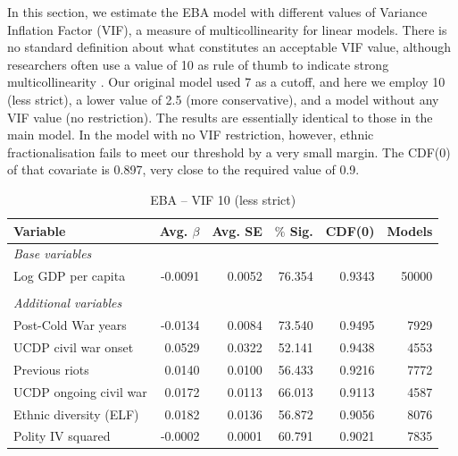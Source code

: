 In this section, we estimate the EBA model with different values of Variance Inflation Factor (VIF), a measure of multicollinearity for linear models. There is no standard definition about what constitutes an acceptable VIF value, although researchers often use a value of 10 as rule of thumb to indicate strong multicollinearity \citep[674]{o2007caution}. Our original model used 7 as a cutoff, and here we employ 10 (less strict), a lower value of 2.5 (more conservative), and a model without any VIF value (no restriction). The results are essentially identical to those in the main model. In the model with no VIF restriction, however, ethnic fractionalisation fails to meet our threshold by a very small margin. The CDF(0) of that covariate is 0.897, very close to the required value of 0.9. 

\vspace{1cm}

\begin{table}[H]
\centering
\begin{tabular}{lrrrrr}
\hline
\textbf{Variable} & \textbf{Avg. $\beta$} & \textbf{Avg. SE} & \textbf{$\%$ Sig.} & \textbf{CDF(0)} & \textbf{Models} \\ \hline
\textit{Base variables} &  &  &  &  &  \\
Log GDP per capita & -0.0091 & 0.0052 & 76.354 & 0.9343 & 50000 \\
 &  &  &  &  &  \\
\textit{Additional variables} &  &  &  &  &  \\
Post-Cold War years & -0.0134 & 0.0084 & 73.540 & 0.9495 & 7929 \\
UCDP civil war onset & 0.0529 & 0.0322 & 52.141 & 0.9438 & 4553 \\
Previous riots & 0.0140 & 0.0100 & 56.433 & 0.9216 & 7772 \\
UCDP ongoing civil war & 0.0172 & 0.0113 & 66.013 & 0.9113 & 4587 \\
Ethnic diversity (ELF) & 0.0182 & 0.0136 & 56.872 & 0.9056 & 8076 \\
Polity IV squared & -0.0002 & 0.0001 & 60.791 & 0.9021 & 7835 \\ \hline
\end{tabular}
\caption{EBA -- VIF 10 (less strict)}
\label{tab:eba1}
\end{table}


